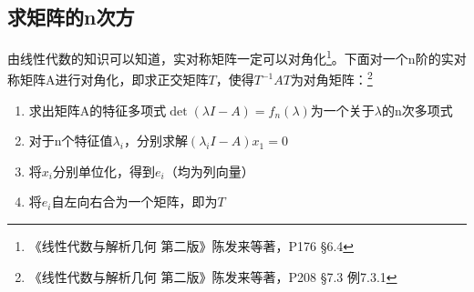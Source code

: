 \documentclass[]{report}
\begin{document}
		\subsection{求矩阵的n次方}
		由线性代数的知识可以知道，实对称矩阵一定可以对角化\footnote{《线性代数与解析几何 第二版》陈发来等著，P176 \S{6.4}}。下面对一个n阶的实对称矩阵A进行对角化，即求正交矩阵$T$，使得$T^{-1}AT$为对角矩阵：\footnote{《线性代数与解析几何 第二版》陈发来等著，P208 \S{7.3} 例7.3.1}
		\begin{enumerate}
			\item 求出矩阵A的特征多项式$\det(\lambda I-A)=f_n(\lambda)$为一个关于$\lambda$的n次多项式
			\item 对于n个特征值$\lambda_i$，分别求解$(\lambda_iI-A)x_1=0$
			\item 将$x_i$分别单位化，得到$e_i$（均为列向量）
			\item 将$e_i$自左向右合为一个矩阵，即为$T$
		\end{enumerate}
\end{document}
